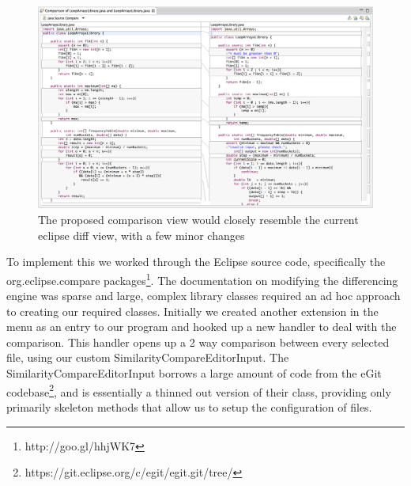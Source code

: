 \begin{figure}[H]
	\centering
		\includegraphics[width=\textwidth]{Figures/EclipseDiffView}
	\caption{The proposed comparison view would closely resemble the current eclipse
	diff view, with a few minor changes}
	\label{fig:diffView}
\end{figure}

To implement this we worked through the Eclipse source code, specifically
the org.eclipse.compare packages\footnote{http://goo.gl/hhjWK7}. The documentation
on modifying the differencing engine was sparse and large, complex library 
classes required an ad hoc approach to creating our required classes.
Initially we created another extension in the menu as an entry to our program
and hooked up a new handler to deal with the comparison. This handler opens
up a 2 way comparison between every selected file, using our custom 
SimilarityCompareEditorInput. The SimilarityCompareEditorInput borrows 
a large amount of code from the eGit
codebase\footnote{https://git.eclipse.org/c/egit/egit.git/tree/}, and is essentially a thinned out version of their
class, providing only primarily skeleton methods that allow us to setup the
configuration of files. 

